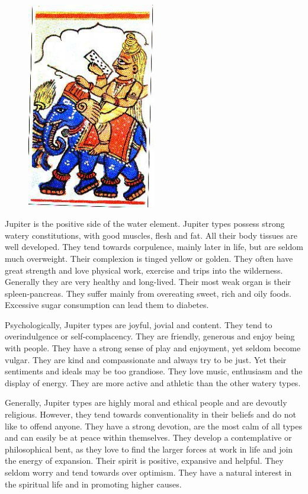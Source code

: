  \begin{figure}[H]
 \centering
\includegraphics[width=0.5\textwidth]{pics/Jupiter_type.png}
 \end{figure}
 
 

Jupiter is the positive side of the water element. Jupiter types possess strong watery constitutions, with good muscles, flesh and fat. All their body tissues are well developed. They tend towards corpulence, mainly later in life, but are seldom much overweight. Their complexion is tinged yellow or golden. They often have great strength and love physical work, exercise and trips into the wilderness. Generally they are very healthy and long-lived. Their most weak organ is their spleen-pancreas. They suffer mainly from overeating sweet, rich and oily foods. Excessive sugar consumption can lead them to diabetes. 

 

Psychologically, Jupiter types are joyful, jovial and content. They tend to overindulgence or self‑complacency. They are friendly, generous and enjoy being with people. They have a strong sense of play and enjoyment, yet seldom become vulgar. They are kind and compassionate and always try to be just. Yet their sentiments and ideals may be too grandiose. They love music, enthusiasm and the display of energy. They are more active and athletic than the other watery types.

 

Generally, Jupiter types are highly moral and ethical people and are devoutly religious. However, they tend towards conventionality in their beliefs and do not like to offend anyone. They have a strong devotion, are the most calm of all types and can easily be at peace within themselves. They develop a contemplative or philosophical bent, as they love to find the larger forces at work in life and join the energy of expansion. Their spirit is positive, expansive and helpful. They seldom worry and tend towards over optimism. They have a natural interest in the spiritual life and in promoting higher causes.

